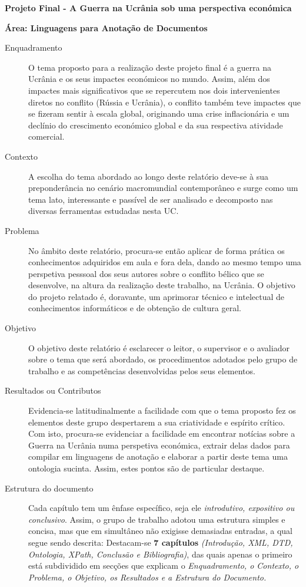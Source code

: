 \documentclass[12pt]{report}
\begin{document}
\textbf{Projeto Final - A Guerra na Ucrânia sob uma perspectiva económica}

\textbf{Área: Linguagens para Anotação de Documentos}

\begin{description} 
  \item[Enquadramento]  O tema proposto para a realização deste projeto final é a guerra na Ucrânia e os seus impactes económicos no mundo. Assim, além dos impactes mais significativos que se repercutem nos dois intervenientes diretos no conflito (Rússia e Ucrânia), o conflito também teve impactes que se fizeram sentir à escala global, originando uma crise inflacionária e um declínio do crescimento económico global e da sua respectiva atividade comercial.
  \item[Contexto] A escolha do tema abordado ao longo deste relatório deve-se à sua preponderância no cenário macromundial contemporâneo e surge como um tema lato, interessante e passível de ser analisado e decomposto nas diversas ferramentas estudadas nesta UC.
  \item[Problema] No âmbito deste relatório, procura-se então aplicar de forma prática os conhecimentos adquiridos em aula e fora dela, dando ao mesmo tempo uma perspetiva pesssoal dos seus autores sobre o conflito bélico que se desenvolve, na altura da realização deste trabalho, na Ucrânia. O objetivo do projeto relatado é, doravante, um aprimorar técnico e intelectual de conhecimentos informáticos e de obtenção de cultura geral. 
  \item[Objetivo] O objetivo deste relatório é esclarecer o leitor, o supervisor e o avaliador sobre o tema que será abordado, os procedimentos adotados pelo grupo de trabalho e as competências desenvolvidas pelos seus elementos.
  \item[Resultados ou Contributos] Evidencia-se latitudinalmente a facilidade com que o tema proposto fez os elementos deste grupo despertarem a sua criatividade e espírito crítico. Com isto, procura-se evidenciar a facilidade em encontrar notícias sobre a Guerra na Ucrânia numa perspetiva económica, extrair delas dados para compilar em linguagens de anotação e elaborar a partir deste tema uma ontologia sucinta. Assim, estes pontos são de particular destaque.
  \item[Estrutura do documento] Cada capítulo tem um ênfase específico, seja ele \textit{introdutivo, expositivo ou conclusivo}. Assim, o grupo de trabalho adotou uma estrutura simples e concisa, mas que em simultâneo não exigisse demasiadas entradas, a qual segue sendo descrita: Destacam-se \textbf{7 capítulos }\textit{(Introdução, XML, DTD, Ontologia, XPath, Conclusão e Bibliografia)}, das quais apenas o primeiro está subdividido em secções que explicam o \textit{Enquadramento, o Contexto, o Problema, o Objetivo, os Resultados e a Estrutura do Documento. }
\end{description}
\end{document}
